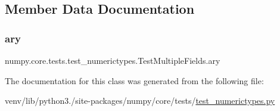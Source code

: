 \subsection{Member Data Documentation}
\mbox{\label{classnumpy_1_1core_1_1tests_1_1test__numerictypes_1_1TestMultipleFields_a7a8b8dd6a71dbb9869c4487147b02858}} 
\subsubsection{\texorpdfstring{ary}{ary}}
{\footnotesize\ttfamily numpy.\+core.\+tests.\+test\+\_\+numerictypes.\+Test\+Multiple\+Fields.\+ary}



The documentation for this class was generated from the following file\+:\begin{DoxyCompactItemize}
\item 
venv/lib/python3./site-\/packages/numpy/core/tests/\hyperlink{test__numerictypes_8py}{test\+\_\+numerictypes.\+py}\end{DoxyCompactItemize}

